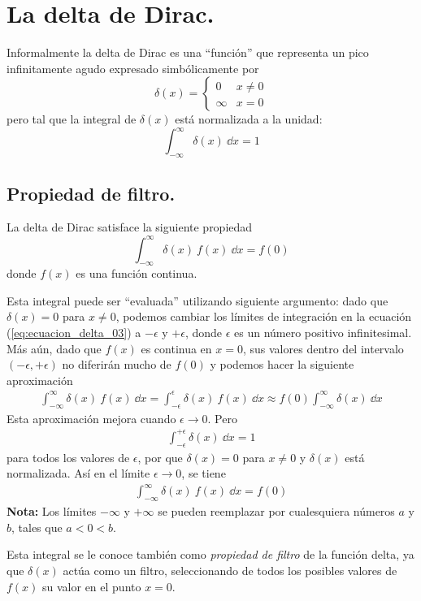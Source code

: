 \section{La delta de Dirac.}
Informalmente la delta de Dirac es una \enquote{función} que representa un pico infinitamente agudo expresado simbólicamente por
\begin{equation}
\delta (x) = \begin{cases}
0 & x \neq 0 \\
\infty & x = 0
\end{cases}
\label{eq:ecuacion_delta_01}
\end{equation}
pero tal que la integral de $\delta (x)$ está normalizada a la unidad:
\begin{equation}
\int_{-\infty}^{\infty} \delta (x) \: \dd{x} = 1 
\label{eq:ecuacion_delta_02}
\end{equation}
\subsection{Propiedad de filtro.}
La delta de Dirac satisface la siguiente propiedad
\begin{equation}
\int_{-\infty}^{\infty} \delta (x) \: f(x) \: \dd{x} = f(0)
\label{eq:ecuacion_delta_03}
\end{equation}
donde $f(x)$ es una función continua.
\par
Esta integral puede ser \enquote{evaluada} utilizando siguiente argumento: dado que $\delta (x) = 0$
para $x \neq 0$, podemos cambiar los límites de integración en la ecuación (\ref{eq:ecuacion_delta_03}) a $- \epsilon$ y $+ \epsilon$, donde $\epsilon$ es un número positivo infinitesimal. Más aún, dado que $f(x)$ es continua en $x = 0$, sus valores dentro del intervalo $( - \epsilon, + \epsilon)$ no diferirán mucho de $f(0)$ y podemos hacer la siguiente aproximación
\begin{align*}
\int_{-\infty}^{\infty} \delta (x) \: f(x) \: \dd{x} = \int_{-\epsilon}^{\epsilon} \delta (x) \: f(x) \: \dd{x} \approx f(0) \int_{-\infty}^{\infty} \delta (x) \: \dd{x}
\end{align*}
Esta aproximación mejora cuando $\epsilon \to 0$. Pero
\begin{align*}
\int_{-\epsilon}^{+\epsilon} \delta (x) \: \dd{x} = 1
\end{align*}
para todos los valores de $\epsilon$, por que $\delta (x) = 0$ para $x \neq 0$ y $\delta (x)$ está normalizada. Así en el límite $\epsilon \to 0$, se tiene
\begin{align*}
\int_{-\infty}^{\infty} \delta (x) \: f(x) \: \dd{x} = f(0)
\end{align*}
\textbf{Nota: } Los límites $-\infty$ y $+\infty$ se pueden reemplazar por cualesquiera números $a$ y $b$, tales que $a < 0 < b$.
\par
Esta integral se le conoce también como \emph{propiedad de filtro} de la función delta, ya que $\delta (x)$ actúa como un filtro, seleccionando de todos los posibles valores de $f(x)$ su valor en el punto $x=0$.
